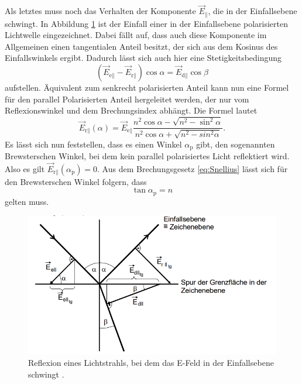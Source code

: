 \noindent Als letztes muss noch das Verhalten der Komponente $\vec{E}_\parallel$, die in der Einfallsebene schwingt.
In Abbildung \ref{fig:RefanG} ist der Einfall einer in der Einfallsebene polarisierten Lichtwelle eingezeichnet.
Dabei fällt auf, dass auch diese Komponente im Allgemeinen einen tangentialen Anteil besitzt, der sich aus dem Kosinus
des Einfallswinkels ergibt. Dadurch lässt sich auch hier eine Stetigkeitsbedingung
\begin{equation}
    \left(\vec{E}_{\text{e}\parallel}- \vec{E}_{\text{r}\parallel}\right)\cos{\alpha}= \vec{E}_{\text{d}\parallel}\cos{\beta}
    \label{Stetpara}
\end{equation}
aufstellen. Äquivalent zum senkrecht polarisierten Anteil kann nun eine Formel für
den parallel Polarisierten Anteil hergeleitet werden, der nur vom Reflexionswinkel und dem Brechungsindex abhängt.
Die Formel lautet
\begin{equation}
    \vec{E}_{\text{r}\parallel}(\alpha)=\vec{E}_{\text{e}\parallel}\frac{n^2\cos{\alpha}-\sqrt{n^2-\sin^2{\alpha}}}{n^2\cos{\alpha}+\sqrt{n^2-sin^2{\alpha}}}.
    \label{eq:Epara}
\end{equation}
Es lässt sich nun feststellen, dass es einen Winkel $\alpha_\text{p}$ gibt, den sogenannten Brewsterschen Winkel, bei dem kein parallel polarisiertes Licht
reflektiert wird. Also es gilt $\vec{E}_{\text{r}\parallel}(\alpha_\text{p})=0$. Aus dem Brechungsgesetz \eqref{eq:Snellius} lässt sich für den Brewsterschen Winkel folgern, dass
\begin{equation}
    \tan{\alpha_\text{p}}=n
    \label{eq:Brewster}
\end{equation}
gelten muss.\cite{sample}
\begin{figure}[H]
    \centering
    \includegraphics[scale=1]{content/Reflexion.png}
    \caption{Reflexion eines Lichtstrahls, bei dem das E-Feld in der Einfallsebene schwingt \cite{sample}.}
    \label{fig:RefanG}
\end{figure}


